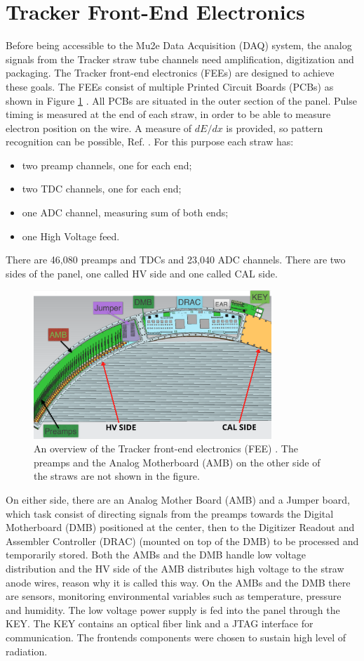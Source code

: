 \section{Tracker Front-End Electronics}
Before being accessible to the Mu2e Data Acquisition (DAQ) system, the analog signals 
from the Tracker straw tube channels need amplification, digitization and packaging. 
The Tracker front-end electronics (FEEs) are designed to achieve these goals. The FEEs 
consist of multiple Printed Circuit Boards (PCBs) as shown in Figure \ref{fig:trackerfee} \cite{vadimmu2e}.
All PCBs are situated in the outer section of the panel. Pulse timing is measured at the 
end of each straw, in order to be able to measure electron position on the wire. A measure 
of $dE/dx$ is provided, so pattern recognition can be possible, Ref. \cite{bartoszek2015mu2e}. For this purpose each straw has:
\begin{itemize}
    \item two preamp channels, one for each end;
    \item two TDC channels, one for each end;
    \item one ADC channel, measuring sum of both ends;
    \item one High Voltage feed.
\end{itemize}
There are 46,080 preamps and TDCs and 23,040 ADC channels. There are two sides of the panel, one called HV side and one called CAL side. 
\begin{figure}[!h]
\centering
\includegraphics[width =0.8\textwidth]{figures/png/Screenshot_20240131_111836.png}
\caption{An overview of the Tracker front-end electronics (FEE) 
\cite{vadimmu2e}. The preamps and the Analog Motherboard (AMB) 
on the other side of the straws are not shown in the figure.}
\label{fig:trackerfee}
\end{figure}
On either side, there are an Analog Mother Board (AMB) and a Jumper board, 
which task consist of directing signals from the preamps towards the Digital 
Motherboard (DMB) positioned at the center, then to the Digitizer Readout and 
Assembler Controller (DRAC) (mounted on top of the DMB) to be processed and 
temporarily stored. Both the AMBs and the DMB handle low voltage distribution 
and the HV side of the AMB distributes high voltage to the straw anode wires, 
reason why it is called this way. On the AMBs and the DMB there are sensors, 
monitoring environmental variables such as temperature, pressure and humidity. 
The low voltage power supply is fed into the panel through the KEY. The KEY 
contains an optical fiber link and a JTAG interface for communication. The 
frontends components were chosen to sustain high level of radiation.
